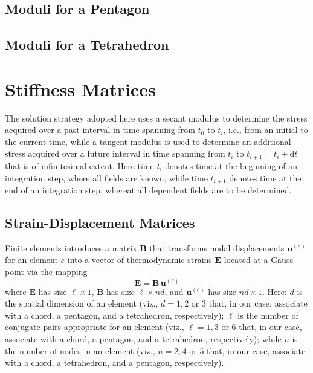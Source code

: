 \subsection{Moduli for a Pentagon}


\subsection{Moduli for a Tetrahedron}


\section{Stiffness Matrices}

The solution strategy adopted here uses a secant modulus to determine the stress acquired over a past interval in time spanning from $t_0$ to $t_i$, i.e., from an initial to the current time, while a tangent modulus is used to determine an additional stress acquired over a future interval in time spanning from $t_i$ to $t_{i+1} = t_i + \mathrm{d}t$ that is of infinitesimal extent.  Here time $t_i$ denotes time at the beginning of an integration step, where all fields are known, while time $t_{i+1}$ denotes time at the end of an integration step, whereat all dependent fields are to be determined.


\subsection{Strain-Displacement Matrices}

Finite elements introduces a matrix $\mathbf{B}$ that transforms nodal displacements $\boldsymbol{u}^{(e)}$ for an element $e$ into a vector of thermo\-dynamic strains $\boldsymbol{E}$ located at a Gauss point via the mapping
\begin{equation}
\boldsymbol{E} = \mathbf{B} \, \boldsymbol{u}^{(e)}
\label{strain} 
\end{equation}
where $\boldsymbol{E}$ has size $\ell \! \times \! 1$, $\mathbf{B}$ has size $\ell \! \times \! nd$, and $\boldsymbol{u}^{(e)}$ has size $nd \! \times \! 1$.  Here: $d$ is the spatial dimension of an element (viz., $d = 1, 2$ or $3$ that, in our case, associate with a chord, a pentagon, and a tetrahedron, respectively); $\ell$ is the number of conjugate pairs appropriate for an element (viz., $\ell = 1, 3$ or $6$ that, in our case, associate with a chord, a pentagon, and a tetrahedron, respectively); while $n$ is the number of nodes in an element (viz., $n=2, 4$ or $5$ that, in our case, associate with a chord, a tetrahedron, and a pentagon, respectively).

